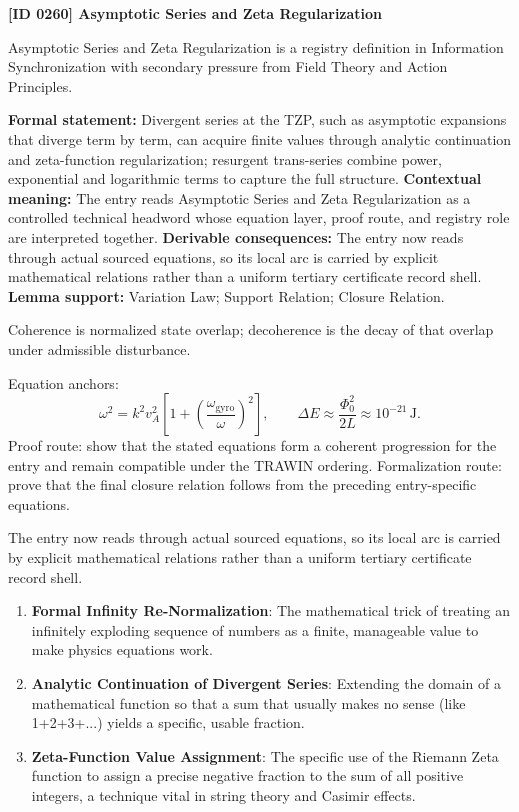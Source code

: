 \clearpage
\noindent\textbf{[ID 0260] Asymptotic Series and Zeta Regularization}\par
\vspace{0.35em}
\begingroup\small
{}
Asymptotic Series and Zeta Regularization is a registry definition in Information Synchronization with secondary pressure from Field Theory and Action Principles.

\begingroup\footnotesize\setlength{\emergencystretch}{3em}\sloppy
\textbf{Formal statement:} Divergent series at the TZP, such as asymptotic expansions that diverge term by term, can acquire finite values through analytic continuation and zeta-function regularization; resurgent trans-series combine power, exponential and logarithmic terms to capture the full structure. \textbf{Contextual meaning:} The entry reads Asymptotic Series and Zeta Regularization as a controlled technical headword whose equation layer, proof route, and registry role are interpreted together. \textbf{Derivable consequences:} The entry now reads through actual sourced equations, so its local arc is carried by explicit mathematical relations rather than a uniform tertiary certificate record shell. \textbf{Lemma support:} Variation Law; Support Relation; Closure Relation.\par
\endgroup

Coherence is normalized state overlap; decoherence is the decay of that overlap under admissible disturbance.

Equation anchors:
\[
\omega^2=k^2v_A^2\left[1+\left(\frac{\omega_{\mathrm{gyro}}}{\omega}\right)^2\right],
\qquad
\Delta E\approx\frac{\Phi_0^2}{2L}\approx10^{-21}\,\mathrm{J}.
\]
Proof route: show that the stated equations form a coherent progression for the entry and remain compatible under the TRAWIN ordering. Formalization route: prove that the final closure relation follows from the preceding entry-specific equations.

The entry now reads through actual sourced equations, so its local arc is carried by explicit mathematical relations rather than a uniform tertiary certificate record shell.
\endgroup

\begin{enumerate}[leftmargin=1.6em,itemsep=6pt,topsep=4pt]
\item \textbf{Formal Infinity Re-Normalization}: The mathematical trick of treating an infinitely exploding sequence of numbers as a finite, manageable value to make physics equations work.
\item \textbf{Analytic Continuation of Divergent Series}: Extending the domain of a mathematical function so that a sum that usually makes no sense (like 1+2+3+...) yields a specific, usable fraction.
\item \textbf{Zeta-Function Value Assignment}: The specific use of the Riemann Zeta function to assign a precise negative fraction to the sum of all positive integers, a technique vital in string theory and Casimir effects.
\end{enumerate}

